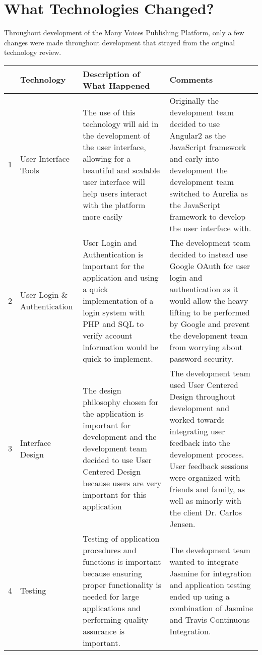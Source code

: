 \documentclass[onecolumn, draftclsnofoot,10pt, compsoc]{IEEEtran}
\begin{document}
\section{What Technologies Changed?}

Throughout development of the Many Voices Publishing Platform, only a few changes were made throughout development that strayed from the original technology review.

\begin{flushleft}
	\tablehead{}
	\begin{supertabular}{|p{0.5cm}|p{3cm}|p{5.5cm}|p{7cm}|}
		\hline
		 & Technology & Description of What Happened & Comments
		\\\hline
		
		1 & User Interface Tools & The use of this technology will aid in the development of the user interface, allowing for a beautiful and scalable user interface will help users interact with the platform more easily & Originally the development team decided to use Angular2 as the JavaScript framework and early into development the development team switched to Aurelia as the JavaScript framework to develop the user interface with. 
		\\\hline
		
		2 & User Login \& Authentication & User Login and Authentication is important for the application and using a quick implementation of a login system with PHP and SQL to verify account information would be quick to implement. & The development team decided to instead use Google OAuth for user login and authentication as it would allow the heavy lifting to be performed by Google and prevent the development team from worrying about password security.
		\\\hline
		
		3 & Interface Design & The design philosophy chosen for the application is important for development and the development team decided to use User Centered Design because users are very important for this application  & The development team used User Centered Design throughout development and worked towards integrating user feedback into the development process. User feedback sessions were organized with friends and family, as well as minorly with the client Dr. Carlos Jensen.
		\\\hline
		
		4 & Testing & Testing of application procedures and functions is important because ensuring proper functionality is needed for large applications and performing quality assurance is important.  & The development team wanted to integrate Jasmine for integration and application testing ended up using a combination of Jasmine and Travis Continuous Integration.
		\\\hline
		

\end{supertabular}
\end{flushleft}
\end{document}
